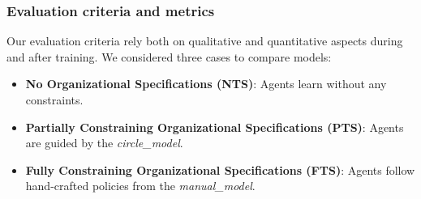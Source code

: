 \documentclass[runningheads]{llncs}
\theoremstyle{freethm}
\theoremstyle{proofoutline}
\begin{document}

\subsubsection{Evaluation criteria and metrics}

Our evaluation criteria rely both on qualitative and quantitative aspects during and after training. We considered three cases to compare models:
\begin{itemize}
    \item \textbf{No Organizational Specifications (NTS)}: Agents learn without any constraints.
    \item \textbf{Partially Constraining Organizational Specifications (PTS)}: Agents are guided by the \textit{circle\_model}.
    \item \textbf{Fully Constraining Organizational Specifications (FTS)}: Agents follow hand-crafted policies from the \textit{manual\_model}.
\end{itemize}
\end{document}
